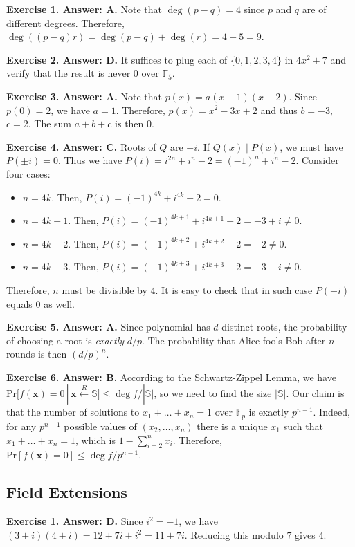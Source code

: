 \documentclass[../lecture-notes-148x210.tex]{subfiles}
\begin{document}
\textbf{Exercise 1. Answer: A.} Note that $\deg(p-q)=4$ since $p$ and $q$ are of
different degrees. Therefore, $\deg((p-q)r)=\deg(p-q)+\deg(r) = 4+5=9$.

\textbf{Exercise 2. Answer: D.} It suffices to plug each of $\{0,1,2,3,4\}$
in $4x^2+7$ and verify that the result is never $0$ over $\mathbb{F}_5$.

\textbf{Exercise 3. Answer: A.} Note that $p(x)=a(x-1)(x-2)$. Since $p(0)=2$, 
we have $a=1$. Therefore, $p(x)=x^2-3x+2$ and thus $b=-3$, $c=2$. The sum 
$a+b+c$ is then $0$.

\textbf{Exercise 4. Answer: C.} Roots of $Q$ are $\pm i$. If $Q(x) \mid P(x)$,
we must have $P(\pm i) = 0$. Thus we have $P(i)=i^{2n}+i^n-2=(-1)^n+i^n-2$. 
Consider four cases:
\begin{itemize}
    \item $n=4k$. Then, $P(i)=(-1)^{4k}+i^{4k}-2=0$.
    \item $n=4k+1$. Then, $P(i)=(-1)^{4k+1}+i^{4k+1}-2=-3+i \neq 0$.
    \item $n=4k+2$. Then, $P(i)=(-1)^{4k+2}+i^{4k+2}-2=-2 \neq 0$.
    \item $n=4k+3$. Then, $P(i)=(-1)^{4k+3}+i^{4k+3}-2=-3-i \neq 0$.
\end{itemize}

Therefore, $n$ must be divisible by $4$. It is easy to check that in such 
case $P(-i)$ equals $0$ as well.

\textbf{Exercise 5. Answer: A.} Since polynomial has $d$ distinct roots,
the probability of choosing a root is \emph{exactly} $d/p$. The probability 
that Alice fools Bob after $n$ rounds is then $(d/p)^n$.

\textbf{Exercise 6. Answer: B.} According to the Schwartz-Zippel Lemma, we have
$\text{Pr}[f(\mathbf{x})=0 \,|\, \mathbf{x} \xleftarrow{R} \mathbb{S}] \leq \deg
f/|\mathbb{S}|$, so we need to find the size $|\mathbb{S}|$. Our claim is that 
the number of solutions to $x_1+\dots+x_n=1$ over $\mathbb{F}_p$ is exactly 
$p^{n-1}$. Indeed, for any $p^{n-1}$ possible values of $(x_2,\dots,x_n)$ there 
is a unique $x_1$ such that $x_1+\dots+x_n=1$, which is $1-\sum_{i=2}^nx_i$. 
Therefore, $\text{Pr}[f(\mathbf{x})=0] \leq \deg f/p^{n-1}$.

\subsection*{Field Extensions}

\textbf{Exercise 1. Answer: D.} Since $i^2=-1$, we have
$(3+i)(4+i)=12+7i+i^2=11+7i$. Reducing this modulo $7$ gives $4$.
\end{document}
